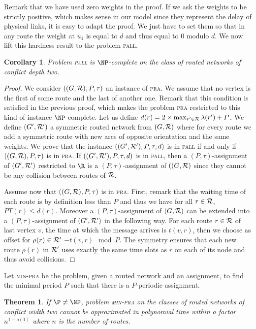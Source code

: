 \documentclass[10pt, conference, letterpaper]{IEEEtran}
\newtheorem{theorem}{Theorem}
\newtheorem{corollary}{Corollary}
\newcommand\pall{\textsc{pall}\xspace}
\newcommand\pra{\textsc{pra}\xspace}
\newcommand\minpra{\textsc{min-pra}\xspace}
\begin{document}
 Remark that we have used zero weights in the proof. If we ask the weights to be strictly positive, which makes sense in our model since they represent the delay of physical links, it is easy to adapt the proof. We just have to set them so that in any route the weight at $u_1$ is equal to $d$ and thus equal to $0$ modulo $d$. We now lift this hardness result to the problem \pall.

\begin{corollary}
Problem \pall is $\NP$-complete on the class of routed networks of conflict depth two.
\end{corollary}
\begin{proof}
 We consider $((G,{\cal R}),P,\tau)$ an instance of \pra. We assume that no vertex is the first of some route and the last of another one. Remark that this condition is satisfied in the previous proof, which makes the problem \pra restricted to this kind of instance $\NP$-complete. 
 Let us define $d(r) = 2 \times \max_{r' \in {\cal R}} \lambda(r') + P$. We define $(G',{\cal R}')$ a symmetric routed network from $(G,{\cal R})$ where for every route we add a symmetric route with new arcs of opposite orientation and the same weights.
 We prove that the instance $((G',{\cal R'}),P,\tau,d)$ is in \pall if and only if $((G,{\cal R}),P,\tau)$ is in \pra.
 If $((G',{\cal R'}),P,\tau,d)$ is in \pall, then a $(P,\tau)$-assignment of $(G',{\cal R'})$ restricted to $\R$ is a $(P,\tau)$-assignment of $((G,{\cal R})$ since they cannot be any collision between routes of ${\cal R}$.
 
 Assume now that $((G,{\cal R}),P,\tau)$ is in \pra. First, remark that the waiting time of each route is by definition less than $P$ and thus we have for all $r\in {\cal R}$, $PT(r) \leq d(r)$. Moreover a $(P,\tau)$-assignment of $(G,{\cal R})$ can be extended into a $(P,\tau)$-assignment of $(G',{\cal R'})$ in the following way. For each route $r \in \cal{R}$ of last vertex $v$, the time at which the message arrives is $t(v,r)$, then we choose as offset for $\rho(r) \in \cal{R}'$ $-t(v,r) \mod P$. The symmetry ensures that each new route $\rho(r)$ in ${\cal R'}$ uses exactly the same time slots as $r$ on each of its node and thus avoid collisions.
\end{proof}

Let \minpra be the problem, given a routed network and an assignment, to find the minimal period $P$ such that there is a $P$-periodic assignment. 

\begin{theorem}\label{th:inapprox}
If $\P \neq \NP$, problem \minpra on the classes of routed networks of conflict width two cannot be approximated in polynomial time within a factor $n^{1-o(1)}$ where $n$ is the number of routes.
\end{theorem}
\end{document}
